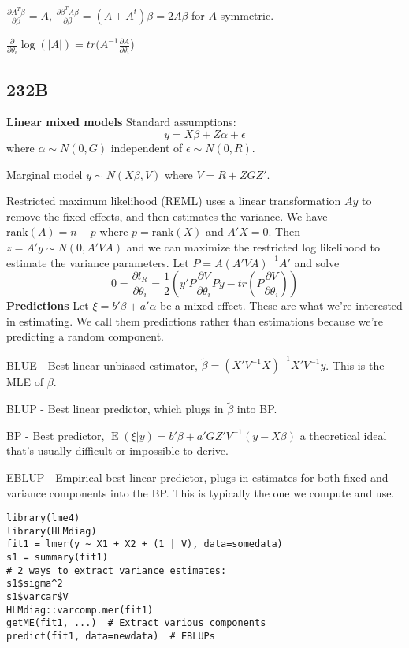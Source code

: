 \documentclass[10pt, twocolumn]{article}
\newcommand{\Expect}{\operatorname{E}}
\begin{document}
$\frac{\partial A^T \beta}{\partial \beta} = A$, 
$\frac{\partial \beta^T A \beta}{\partial \beta} = (A + A^t) \beta =
2A\beta$ for $A$ symmetric.

$\frac{\partial}{\partial \theta_i} \log (|A|) =
tr( A^{-1} \frac{\partial A}{\partial \theta_i}$)

\newpage

\subsection*{232B}

\textbf{Linear mixed models} Standard assumptions:
\[
    y = X \beta + Z \alpha + \epsilon
\]
where $\alpha \sim N(0, G)$ independent of  $\epsilon \sim N(0, R)$.

Marginal model $y \sim N(X \beta, V)$ where $V = R + ZGZ'$.

Restricted maximum likelihood (REML) uses a linear transformation
$Ay$ to remove the fixed effects, and then estimates the variance.
We have $\text{rank} (A) = n - p$ where $p = \text{rank} (X)$ and $A'X =
0$. Then $z = A'y \sim N(0, A'VA)$ and we can maximize the restricted log likelihood
to estimate the variance parameters. Let $P = A(A'VA)^{-1}A'$ and solve
\[
    0 = \frac{\partial l_R}{\partial \theta_i} = \frac{1}{2}
    \left( y'P \frac{\partial V}{\partial \theta_i} Py 
    - tr (P \frac{\partial V}{\partial \theta_i})
    \right)
\]
\textbf{Predictions}
Let $\xi = b' \beta + a' \alpha$ be a mixed effect. These are what we're
interested in estimating. We call them predictions rather than estimations
because we're predicting a random component.

BLUE - Best linear unbiased estimator, 
$\tilde{\beta} = (X' V^{-1} X)^{-1} X' V^{-1} y$. This is the MLE of
$\beta$.

BLUP - Best linear predictor, which plugs in $\tilde{\beta}$ into BP.

BP - Best predictor, $\Expect (\xi | y) = b' \beta + a' G Z' V^{-1} (y - X
\beta)$ a theoretical ideal that's
usually difficult or impossible to derive.

EBLUP - Empirical best linear predictor, plugs in estimates for both fixed
and variance components into the BP. This is
typically the one we compute and use.

\begin{verbatim}
library(lme4)
library(HLMdiag)
fit1 = lmer(y ~ X1 + X2 + (1 | V), data=somedata)
s1 = summary(fit1)
# 2 ways to extract variance estimates:
s1$sigma^2
s1$varcar$V
HLMdiag::varcomp.mer(fit1)
getME(fit1, ...)  # Extract various components
predict(fit1, data=newdata)  # EBLUPs
\end{verbatim}
\end{document}
